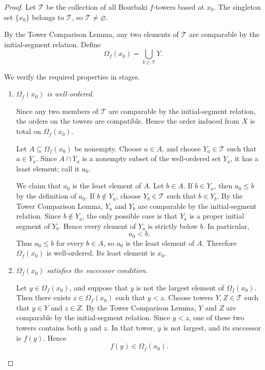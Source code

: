 \documentclass[10pt,a4paper]{amsart}
\begin{document}
\begin{proof}
Let \(\mathcal T\) be the collection of all Bourbaki \(f\)-towers based at \(x_0\). The
singleton set \(\{x_0\}\) belongs to \(\mathcal T\), so \(\mathcal T\neq\varnothing\).

By the Tower Comparison Lemma, any two elements of \(\mathcal T\) are comparable by
the initial-segment relation. Define
\[
\Omega_f(x_0)=\bigcup_{Y\in\mathcal T}Y.
\]

We verify the required properties in stages.

\begin{enumerate}
\item \emph{\(\Omega_f(x_0)\) is well-ordered.}

Since any two members of \(\mathcal T\) are comparable by the initial-segment relation,
the orders on the towers are compatible. Hence the order induced from \(X\) is total on
\(\Omega_f(x_0)\).

Let \(A\subseteq \Omega_f(x_0)\) be nonempty. Choose \(a\in A\), and choose
\(Y_a\in\mathcal T\) such that \(a\in Y_a\). Since \(A\cap Y_a\) is a nonempty subset of
the well-ordered set \(Y_a\), it has a least element; call it \(a_0\).

We claim that \(a_0\) is the least element of \(A\). Let \(b\in A\). If \(b\in Y_a\), then
\(a_0\leq b\) by the definition of \(a_0\). If \(b\notin Y_a\), choose
\(Y_b\in\mathcal T\) such that \(b\in Y_b\). By the Tower Comparison Lemma, \(Y_a\) and
\(Y_b\) are comparable by the initial-segment relation. Since \(b\notin Y_a\), the only
possible case is that \(Y_a\) is a proper initial segment of \(Y_b\). Hence every element
of \(Y_a\) is strictly below \(b\). In particular,
\[
a_0<b.
\]
Thus \(a_0\leq b\) for every \(b\in A\), so \(a_0\) is the least element of \(A\).
Therefore \(\Omega_f(x_0)\) is well-ordered. Its least element is \(x_0\).

\item \emph{\(\Omega_f(x_0)\) satisfies the successor condition.}

Let \(y\in\Omega_f(x_0)\), and suppose that \(y\) is not the largest element of
\(\Omega_f(x_0)\). Then there exists \(z\in\Omega_f(x_0)\) such that \(y<z\). Choose
towers \(Y,Z\in\mathcal T\) such that \(y\in Y\) and \(z\in Z\). By the Tower Comparison
Lemma, \(Y\) and \(Z\) are comparable by the initial-segment relation. Since \(y<z\), one
of these two towers contains both \(y\) and \(z\). In that tower, \(y\) is not largest, and
its successor is \(f(y)\). Hence
\[
f(y)\in\Omega_f(x_0).
\]


\end{enumerate}
\end{proof}
\end{document}

